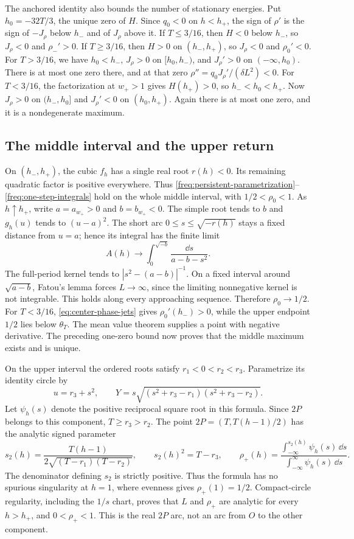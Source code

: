 The anchored identity also bounds the number of stationary energies.
Put $h_0=-32T/3$, the unique zero of $H$.  Since $q_0<0$ on
$h<h_+$, the sign of $\rho'$ is the sign of $-J_\rho$ below $h_-$
and of $J_\rho$ above it.  If $T\le3/16$, then $H<0$ below $h_-$,
so $J_\rho<0$ and $\rho_-'>0$.  If $T\ge3/16$, then $H>0$
on $(h_-,h_+)$, so $J_\rho<0$ and $\rho_0'<0$.
For $T>3/16$, we have $h_0<h_-$, $J_\rho>0$ on $[h_0,h_-)$,
and $J_\rho'>0$ on $(-\infty,h_0)$.  There is at most one zero
there, and at that zero
$\rho''=q_0J_\rho'/(\delta L^2)<0$.
For $T<3/16$, the factorization at $w_+>1$ gives $H(h_+)>0$,
so $h_-<h_0<h_+$.  Now $J_\rho>0$ on $(h_-,h_0]$ and
$J_\rho'<0$ on $(h_0,h_+)$.  Again there is at most one zero,
and it is a nondegenerate maximum.

\subsection{The middle interval and the upper return}

On $(h_-,h_+)$, the cubic $f_h$ has a single real root $r(h)<0$.
Its remaining quadratic factor is positive everywhere.  Thus
\eqref{freq:persistent-parametrization}--\eqref{freq:one-step-integrals}
hold on the whole middle interval, with $1/2<\rho_0<1$.
As $h\uparrow h_+$, write $a=a_{w_+}>0$ and $b=b_{w_+}<0$.
The simple root tends to $b$ and $g_h(u)$ tends to $(u-a)^2$.
The short arc $0\le s\le\sqrt{-r(h)}$ stays a fixed distance from
$u=a$; hence its integral has the finite limit
\[
 A(h)\longrightarrow\int_0^{\sqrt{-b}}\frac{\dd s}{a-b-s^2}.
\]
The full-period kernel tends to $|s^2-(a-b)|^{-1}$.
On a fixed interval around $\sqrt{a-b}$, Fatou's lemma forces
$L\to\infty$, since the limiting nonnegative kernel is not integrable.
This holds along every approaching sequence.  Therefore
$\rho_0\to1/2$.  For $T<3/16$, \eqref{eq:center-phase-jets} gives
$\rho_0'(h_-)>0$, while the upper endpoint $1/2$ lies below
$\theta_T$.  The mean value theorem supplies a point with negative
derivative.  The preceding one-zero bound now proves that the middle
maximum exists and is unique.

On the upper interval the ordered roots satisfy $r_1<0<r_2<r_3$.
Parametrize its identity circle by
\[
 u=r_3+s^2,\qquad
 Y=s\sqrt{(s^2+r_3-r_1)(s^2+r_3-r_2)}.
\]
Let $\psi_h(s)$ denote the positive reciprocal square root in this
formula.  Since $2P$ belongs to this component, $T\ge r_3>r_2$.
The point $2P=(T,T(h-1)/2)$ has the analytic signed parameter
\begin{equation}\label{freq:upper-real-arc}
 s_2(h)=\frac{T(h-1)}{2\sqrt{(T-r_1)(T-r_2)}},\qquad
 s_2(h)^2=T-r_3,\qquad
 \rho_+(h)=\frac{\displaystyle\int_{-\infty}^{s_2(h)}\psi_h(s)\,\dd s}
 {\displaystyle\int_{-\infty}^{\infty}\psi_h(s)\,\dd s}.
\end{equation}
The denominator defining $s_2$ is strictly positive.  Thus the formula
has no spurious singularity at $h=1$, where evenness gives
$\rho_+(1)=1/2$.  Compact-circle regularity, including the $1/s$ chart,
proves that $L$ and $\rho_+$ are analytic for every $h>h_+$, and
$0<\rho_+<1$.  This is the real $2P$ arc, not an arc from $O$ to the
other component.

